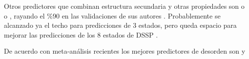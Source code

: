 
Otros predictores que combinan estructura secundaria y otras propiedades son 
 o 
o , rayando el \%90 en las validaciones de sus autores \citep{Magnan2014}.
Probablemente se alcanzado ya el techo para predicciones de 3 estados, pero queda espacio para mejorar las predicciones 
de los 8 estados de DSSP \citep{Yang2018}. %

De acuerdo con meta-an\'{a}lisis recientes los mejores predictores de desorden son
 y
\citep{Wang2016,Meng2017}

